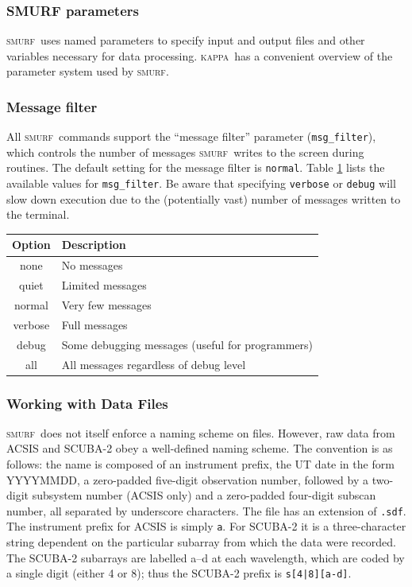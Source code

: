 \documentclass[twoside,11pt]{article}
\newcommand{\xref}[3]{#1}
\renewcommand{\_}{\texttt{\symbol{95}}}
\newcommand{\KAPPA}{\textsc{kappa}}
\newcommand{\KAPPAref}{\xref{\KAPPA}{sun95}{}}
\newcommand{\SMURF}{\textsc{smurf}}
\begin{document}
\subsubsection{SMURF parameters}

\SMURF\ uses named parameters to specify input and output files and
other variables necessary for data processing. \KAPPAref\ has a
convenient overview of the parameter system used by \SMURF.

\subsubsection{Message filter}

All \SMURF\ commands support the ``message filter'' parameter
(\verb+msg_filter+), which controls the number of messages \SMURF\
writes to the screen during routines. The default setting for the
message filter is \verb+normal+. Table \ref{tab:msgfilter}  lists the available
values for \verb+msg_filter+. Be aware that specifying \verb+verbose+
or \verb+debug+ will slow down execution due to the (potentially vast)
number of messages written to the terminal.

\begin{table}
\centering
\begin{tabular}{|c|l|}
\hline
Option  & Description \\
\hline
none   & No messages \\
quiet   & Limited messages \\
normal  & Very few messages \\
verbose & Full messages \\
debug   & Some debugging messages (useful for programmers) \\
all & All messages regardless of debug level \\
\hline
\end{tabular}
\label{tab:msgfilter}
\end{table}

\subsubsection{Working with Data Files}

\SMURF\ does not itself enforce a naming scheme on files. However, raw
data from ACSIS and SCUBA-2 obey a well-defined naming scheme. The
convention is as follows: the name is composed of an instrument
prefix, the UT date in the form YYYYMMDD, a zero-padded five-digit
observation number, followed by a two-digit subsystem number (ACSIS
only) and a zero-padded four-digit subscan number, all separated by
underscore characters. The file has an extension of \verb+.sdf+. The
instrument prefix for ACSIS is simply \verb+a+. For SCUBA-2 it is a
three-character string dependent on the particular subarray from which
the data were recorded. The SCUBA-2 subarrays are labelled a--d at
each wavelength, which are coded by a single digit (either 4 or 8);
thus the SCUBA-2 prefix is \verb+s[4|8][a-d]+.
\end{document}
